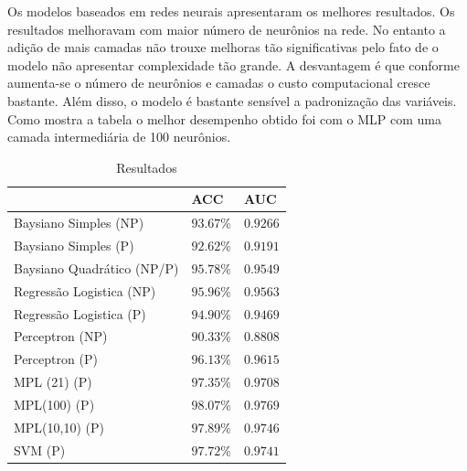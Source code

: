\documentclass[11pt,a4paper]{article}
\numberwithin{equation}{section}
\begin{document}
Os modelos baseados em redes neurais apresentaram os melhores resultados. Os resultados melhoravam com maior número de neurônios na rede. No entanto a adição de mais camadas não trouxe melhoras tão significativas pelo fato de o modelo não apresentar complexidade tão grande.  A desvantagem é que conforme aumenta-se o número de neurônios e camadas o custo computacional cresce bastante. Além disso, o modelo é bastante sensível a padronização das variáveis. Como mostra a tabela o melhor desempenho obtido foi com o MLP com uma camada intermediária de 100 neurônios.

\begin{table}[H]
\centering
\caption{Resultados}
\label{tab:results}
\begin{tabular}{l l l} \hline
 & \textbf{ACC} & \textbf{AUC}\\
\hline
Baysiano Simples (NP)      & $93.67\%$          & $0.9266$          \\ 
Baysiano Simples (P)       & $92.62\%$          & $0.9191$          \\ 
Baysiano Quadrático (NP/P) & $95.78\%$          & $0.9549$          \\ 
Regressão Logistica (NP)   & $95.96\%$          & $0.9563$          \\ 
Regressão Logistica (P)    & $94.90\%$          & $0.9469$          \\ 
Perceptron (NP)            & $90.33\%$          & $0.8808$          \\ 
Perceptron (P)             & $96.13\%$          & $0.9615$          \\ 
MPL (21) (P)               & $97.35\%$          & $0.9708$          \\ 
MPL(100) (P)               & $\mathbf{98.07\%}$ & $\mathbf{0.9769}$ \\ 
MPL(10,10) (P)             & $97.89\%$          & $0.9746$          \\ 
SVM (P)                    & $97.72\%$          & $0.9741$          \\ 
\hline
\end{tabular}
\end{table}
\end{document}
